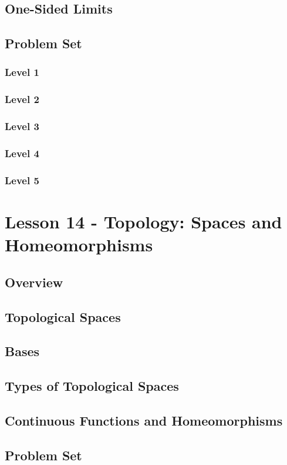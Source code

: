 \documentclass{article}
\begin{document}
\subsection{One-Sided Limits}
\subsection{Problem Set}
\subsubsection{Level 1}
\subsubsection{Level 2}
\subsubsection{Level 3}
\subsubsection{Level 4}
\subsubsection{Level 5}
\pagebreak

\section{Lesson 14 - Topology: Spaces and Homeomorphisms}
\subsection{Overview}
\subsection{Topological Spaces}
\subsection{Bases}
\subsection{Types of Topological Spaces}
\subsection{Continuous Functions and Homeomorphisms}
\subsection{Problem Set}
\end{document}
